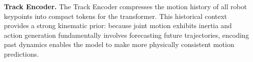\noindent \textbf{Track Encoder.}
%
%
The Track Encoder compresses the motion history of all robot keypoints into compact tokens for the transformer. This historical context provides a strong kinematic prior: because joint motion exhibits inertia and action generation fundamentally involves forecasting future trajectories, encoding past dynamics enables the model to make more physically consistent motion predictions.



